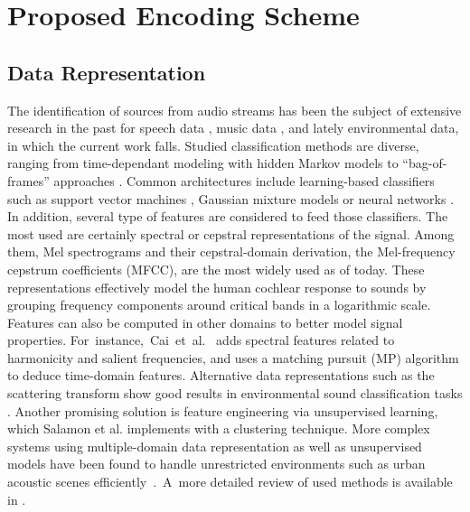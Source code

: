 \documentclass[sensors,article,accept,moreauthors,pdftex,10pt,a4paper]{mdpi}
\begin{document}
\section{Proposed Encoding Scheme} \label{sec:coder}
\vspace{-6pt}

\subsection{Data Representation}

The identification of sources from audio streams has been the subject of extensive research in the past for speech data \cite{anusuya2009}, music data \cite{tzanetakis2002}, and lately environmental {data,} in which the current work falls. Studied classification methods are diverse, ranging from time-dependant modeling with hidden Markov models \cite{ntalampiras2014} to ``bag-of-frames'' approaches \cite{aucouturier2007, foggia2015}. Common architectures include learning-based classifiers such as support vector machines \cite{kumar2016}, Gaussian mixture models \cite{radhakrishnan2005} or neural networks \cite{salamon2017, piczak2015}. {In addition}, several type of features are considered to feed those classifiers. The most used are certainly spectral \cite{khunarsal2013} or cepstral \cite{couvreur2004} representations of the signal. Among them, Mel spectrograms and their cepstral-domain derivation, the Mel-frequency cepstrum coefficients (MFCC), are the most widely used as of today. These representations effectively model the human cochlear response to sounds by grouping frequency components around critical bands in a logarithmic scale. Features can also be computed in other domains to better model signal properties. \mbox{For {instance,} {Cai et al.} \cite{cai2006}} adds spectral features related to harmonicity and salient frequencies, and \cite{chu2009} uses a matching pursuit (MP) algorithm to deduce time-domain features. Alternative data representations such as the scattering transform \cite{bauge2013} show good results in environmental sound classification tasks \cite{salamon2015}. Another promising solution is feature engineering via unsupervised learning, {which} {Salamon et al.} \cite{salamon2015-2} implements with a clustering technique. More complex systems using multiple-domain data representation as well as unsupervised models have been found to handle unrestricted environments such as urban acoustic scenes \mbox{efficiently \citep{ntalampiras2012}. }A~more detailed review of used methods is available in \cite{chachada2013}.
\end{document}
